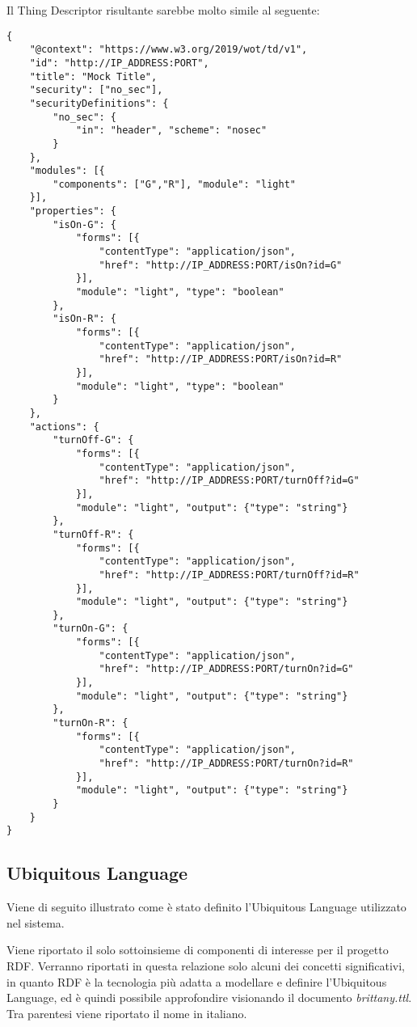 Il Thing Descriptor risultante sarebbe molto simile al seguente:
\begin{verbatim}
{
	"@context": "https://www.w3.org/2019/wot/td/v1",
	"id": "http://IP_ADDRESS:PORT",
	"title": "Mock Title",
	"security": ["no_sec"],
	"securityDefinitions": {
		"no_sec": {
			"in": "header", "scheme": "nosec"
		}
	},
	"modules": [{
		"components": ["G","R"], "module": "light"
	}],
	"properties": {
		"isOn-G": {
			"forms": [{
				"contentType": "application/json",
				"href": "http://IP_ADDRESS:PORT/isOn?id=G"
			}],
			"module": "light", "type": "boolean"
		},
		"isOn-R": {
			"forms": [{
				"contentType": "application/json",
				"href": "http://IP_ADDRESS:PORT/isOn?id=R"
			}],
			"module": "light", "type": "boolean"
		}
	},
	"actions": {
		"turnOff-G": {
			"forms": [{
				"contentType": "application/json",
				"href": "http://IP_ADDRESS:PORT/turnOff?id=G"
			}],
			"module": "light", "output": {"type": "string"}
		},
		"turnOff-R": {
			"forms": [{
				"contentType": "application/json",
				"href": "http://IP_ADDRESS:PORT/turnOff?id=R"
			}],
			"module": "light", "output": {"type": "string"}
		},
		"turnOn-G": {
			"forms": [{
				"contentType": "application/json",
				"href": "http://IP_ADDRESS:PORT/turnOn?id=G"
			}],
			"module": "light", "output": {"type": "string"}
		},
		"turnOn-R": {
			"forms": [{
				"contentType": "application/json",
				"href": "http://IP_ADDRESS:PORT/turnOn?id=R"
			}],
			"module": "light", "output": {"type": "string"}
		}
	}
}
\end{verbatim}

\subsection{Ubiquitous Language}
Viene di seguito illustrato come è stato definito l’Ubiquitous Language utilizzato nel sistema.

\noindent Viene riportato il solo sottoinsieme di componenti di interesse per il progetto RDF. Verranno riportati in questa relazione solo alcuni dei concetti significativi, in quanto RDF è la tecnologia più adatta a modellare e definire l'Ubiquitous Language, ed è quindi possibile approfondire visionando il documento \textit{brittany.ttl}. Tra parentesi viene riportato il nome in italiano.


